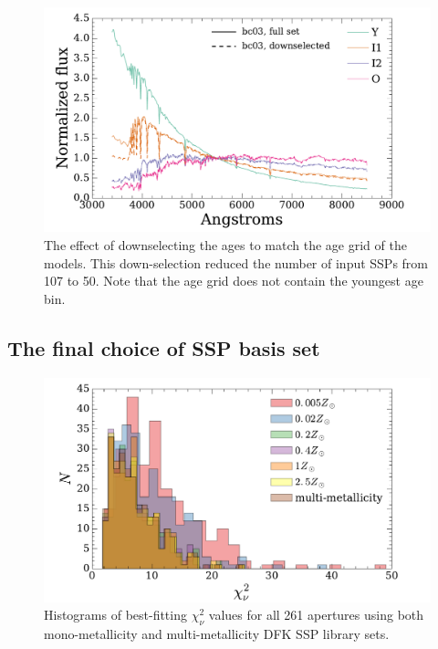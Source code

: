 \begin{figure}
  \centering
  \includegraphics[width=\columnwidth]{891_2/figs/bc_downselect.pdf}
  \caption[Effect of downselecting BC03 age
    resolution]{\fixspacing\label{891_2:fig:bc03_downselect}The effect
    of downselecting the  ages to match the age
    grid of the  models. This down-selection
    reduced the number of input SSPs from 107 to 50. Note that the
     age grid does not contain the youngest age
    bin.}
\end{figure}

\subsection{The final choice of SSP basis set}
\label{891_2:sec:final_SSP}
\begin{figure}
  \centering
  \includegraphics[width=\columnwidth]{891_2/figs/dfk_chihist.pdf}
  \caption[$\chi_{\nu}^2$ distributions for different metallicity
    fits]{\fixspacing\label{891_2:fig:chisq_hist}Histograms of
    best-fitting $\chi^2_\nu$ values for all 261 apertures using both
    mono-metallicity and multi-metallicity DFK SSP library sets.}
\end{figure}

